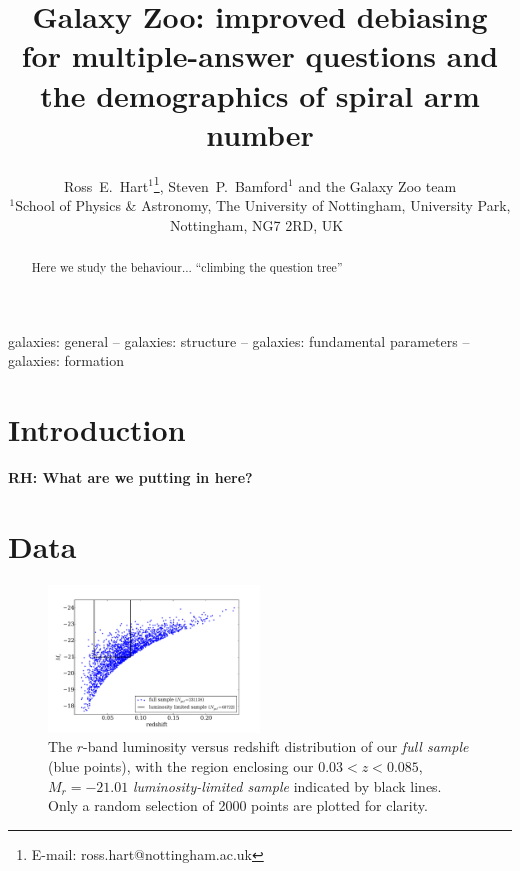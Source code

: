 \documentclass[useAMS,usenatbib]{mn2e}
\newcommand{\rh}[1]{{\bf \textcolor{RoyalPurple}{RH: #1}}}
\begin{document}
\title{Galaxy Zoo: improved debiasing for multiple-answer questions and the demographics of spiral arm number}
\author[Hart et al.]{Ross~E.~Hart$^1$\thanks{E-mail: ross.hart@nottingham.ac.uk}, Steven~P.~Bamford$^1$ and the Galaxy Zoo team
\smallskip\\
$^{1}$School of Physics \& Astronomy, The University of Nottingham, University Park, Nottingham, NG7 2RD, UK\
}
\maketitle
\begin{abstract}
Here we study the behaviour...
``climbing the question tree''
\end{abstract}

\begin{keywords}
galaxies: general -- galaxies: structure -- galaxies: fundamental parameters -- galaxies: formation
\end{keywords}

\section{Introduction}
\label{sec:intro}

\rh{What are we putting in here?}

\section{Data}
\label{sec:data}

\begin{figure}
		\centering
		\includegraphics[width=0.5\textwidth]{Data_imgs/volume_limited_sample.pdf}
    \caption{The $r$-band luminosity versus redshift distribution of our \textit{full sample} (blue points), with the region enclosing our $0.03<z<0.085$, $M_r  = -21.01$ \textit{luminosity-limited sample} indicated by black lines. Only a random selection of 2000 points are plotted for clarity.
		\label{fig:vl_sample}}
\end{figure}
\end{document}
